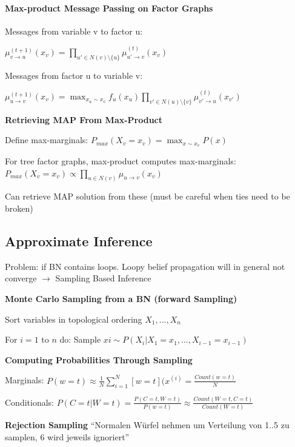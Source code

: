 \documentclass[a4paper, 10pt]{scrartcl}
\begin{document}
\begin{multicols*}{3}
\paragraph{Max-product Message Passing on Factor Graphs}

Messages from variable v to factor u: 

$\mu^{(t+1)}_{v \rightarrow u}(x_v) = \prod_{u' \in N(v) \setminus \{u\}} \mu^{(t)}_{u' \rightarrow v}(x_{v})$ 

Messages from factor u to variable v:

$\mu^{(t+1)}_{u \rightarrow v}(x_v) = \max_{x_u \sim x_v} f_u(x_u) \prod_{v' \in N(u) \setminus \{v\}} \mu^{(t)}_{v' \rightarrow u}(x_{v'})$ 
 
 \textbf{Retrieving MAP From Max-Product}
 \begin{compactitem}
 \item Define max-marginals: $P_{max}(X_v =x_v) = \max_{x \sim x_v} P(x)$
 \item For tree factor graphs, max-product computes max-marginals: 
 $P_{max}(X_v = x_v) \propto \prod_{u \in N(v)} \mu_{u \rightarrow v} (x_v)$ 
\item Can retrieve MAP solution from these (must be careful when ties need to be broken)
\end{compactitem}
\subsection{Approximate Inference}
Problem: if BN contains loops.
Loopy belief propagation will in general not converge	$\rightarrow$ Sampling Based Inference

\textbf{Monte Carlo Sampling from a BN (forward Sampling)}
\begin{compactitem}
	\item Sort variables in topological ordering $X_1,...,X_n$
	\item For $i=1$ to 	$n$ do: Sample $xi \sim P(X_i | X_1=x_1, ..., X_{i-1}=x_{i-1})$
\end{compactitem}

\textbf{Computing Probabilities Through Sampling}

Marginals: $P(w=t) \approx \frac{1}{N} \sum_{i=1}^{N}[w=t](x^{(i)} =\frac{ Count(w=t)}{N}$

Conditionals: $P(C=t | W=t) = \frac{P(C=t, W=t)}{P(w=t)} \approx \frac{Count(W=t, C=t)}{Count(W=t)}$

\textbf{Rejection Sampling}
``Normalen Würfel nehmen um Verteilung von 1..5 zu samplen, 6 wird jeweils ignoriert''


\end{multicols*}
\end{document}
